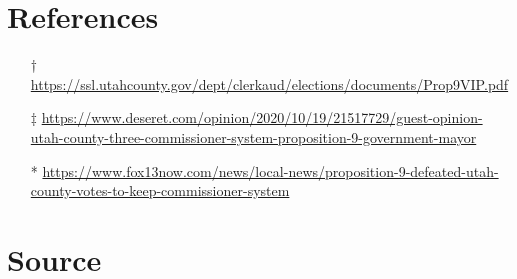 \pagebreak

\section*{References}

\begin{itemize}
    \item[†] \url{https://ssl.utahcounty.gov/dept/clerkaud/elections/documents/Prop9VIP.pdf}
    \item[‡] \url{https://www.deseret.com/opinion/2020/10/19/21517729/guest-opinion-utah-county-three-commissioner-system-proposition-9-government-mayor}
    \item[*] \url{https://www.fox13now.com/news/local-news/proposition-9-defeated-utah-county-votes-to-keep-commissioner-system}
\end{itemize}

\section*{Source}
